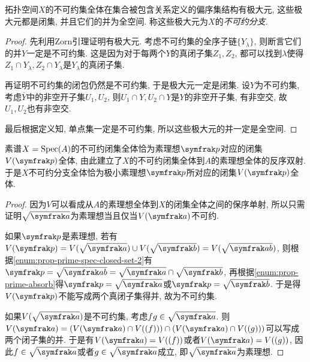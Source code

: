\begin{proposition}
  拓扑空间$X$的不可约集全体在集合被包含关系定义的偏序集结构有极大元, 这些极大元都是闭集, 并且它们的并为全空间. 称这些极大元为$X$的\emph{不可约分支}.
\end{proposition}

\begin{proof}
  先利用Zorn引理证明有极大元. 考虑不可约集的全序子链$\{Y_\lambda\}$, 则断言它们的并$Y$一定是不可约集. 这是因为对于每两个$Y$的真闭子集$Z_1, Z_2$, 都可以找到$\lambda$使得$Z_1\cap Y_\lambda, Z_2\cap Y_\lambda$是$Y_\lambda$的真闭子集.

  再证明不可约集的闭包仍然是不可约集, 于是极大元一定是闭集. 设$Y$为不可约集, 考虑$\overline{Y}$中的非空开子集$U_1, U_2$, 则$U_1\cap Y, U_2\cap Y$是$Y$的非空开子集, 有非空交, 故$U_1, U_2$也有非空交.

  最后根据定义知, 单点集一定是不可约集, 所以这些极大元的并一定是全空间.
\end{proof}

\begin{proposition}
  素谱$X=\operatorname{Spec} (A)$的不可约闭集全体恰为素理想$\ideal{p}$对应的闭集$V(\ideal{p})$全体, 由此建立了$X$的不可约闭集全体到$A$的素理想全体的反序双射. 于是$X$不可约分支全体恰为极小素理想$\ideal{p}$所对应的闭集$V(\ideal{p})$全体.
\end{proposition}

\begin{proof}
  因为$V$可以看成从$A$的素理想全体到$X$的闭集全体之间的保序单射, 所以只需证明$\sqrt{\ideal{a}}$为素理想当且仅当$V(\ideal{a})$不可约.

  如果$\ideal{p}$是素理想, 若有$V(\ideal{p})=V(\sqrt{\ideal{a}})\cup V(\sqrt{\ideal{b}})=V(\sqrt{\ideal{ab}})$, 则根据\ref{enum:prop-prime-spec-closed-set-2}有$\ideal{p}=\sqrt{\ideal{ab}}=\sqrt{\ideal{a}}\cap\sqrt{\ideal{b}}$, 再根据\ref{enum:prop-prime-absorb}得$\ideal{p}=\sqrt{\ideal{a}}$或$\ideal{p}=\sqrt{\ideal{b}}$. 于是得$V(\ideal{p})$不能写成两个真闭子集得并, 故为不可约集.

  如果$V(\sqrt{\ideal{a}})$是不可约集, 考虑$fg\in\sqrt{\ideal{a}}$. 则$V(\ideal{a})=(V(\ideal{a})\cap V((f)))\cap (V(\ideal{a})\cap V((g)))$可以写成两个闭子集的并. 于是有$V(\ideal{a})=V((f))$或者$V(\ideal{a})=V((g))$, 因此$f\in \sqrt{\ideal{a}}$或者$g\in \sqrt{\ideal{a}}$成立, 即$\sqrt{\ideal{a}}$为素理想.
\end{proof}

